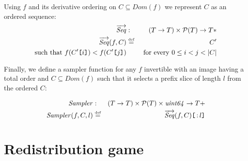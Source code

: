 \begin{definition}
\label{def:sampler}
%
Using $f$ and its derivative ordering on $C\subseteq\mathit{Dom}(f)$ we represent $C$ as an ordered sequence:
%
\begin{eqnarray}
\overrightarrow{\mathit{Seq}}
&:&(T\to  T)\times\mathcal{P}(T)\to T{*}\\
\overrightarrow{\mathit{Seq}}(f,C) 
&\overset{\textrm{\tiny def}}{=}& C'\\
\text{such that }
f(C'\texttt{[}\/i\/\texttt{]})<f(C'\texttt{[}\/j\/\texttt{]}) &&\text{ for every } 0\leq i<j<\lvert C\rvert
\end{eqnarray}


Finally, we define a sampler function for any $f$ invertible with an image having a total order and $C\subseteq\mathit{Dom}(f)$ such that it selects a prefix slice of length $l$ from the ordered $C$:         

\begin{eqnarray}
\mathit{Sampler} &:&(T\to  T)\times\mathcal{P}(T)\times \mathit{uint64}\to T{+}\\
\mathit{Sampler}(f,C,l) &\overset{\textrm{\tiny def}}{=}& \overrightarrow{\mathit{Seq}}(f,C)\texttt{[}\/\operatorname{:} l\/\texttt{]}
\end{eqnarray}
\end{definition}

\section{Redistribution game}\label{sec:appendix-game}
\label{sec:redistribution-game}


